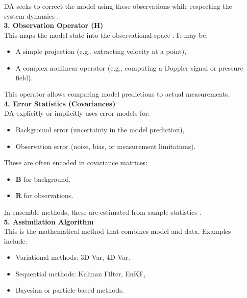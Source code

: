 \documentclass[a4paper]{article}
\begin{document}
DA seeks to correct the model using these observations while respecting the system dynamics \parencite{wikle2007bayesian}.\\

\textbf{3. Observation Operator (H)}\\

This maps the model state into the observational space \parencite{law2015data}. It may be:\\

\begin{itemize}
  \item A simple projection (e.g., extracting velocity at a point),
  \item A complex nonlinear operator (e.g., computing a Doppler signal or pressure field).
\end{itemize}

This operator allows comparing model predictions to actual measurements.\\

\textbf{4. Error Statistics (Covariances)}\\

DA explicitly or implicitly uses error models for:\\

\begin{itemize}
  \item Background error (uncertainty in the model prediction),
  \item Observation error (noise, bias, or measurement limitations).
\end{itemize}

These are often encoded in covariance matrices:\\

\begin{itemize}
  \item $\mathbf{B}$ for background,
  \item $\mathbf{R}$ for observations.
\end{itemize}

In ensemble methods, these are estimated from sample statistics \parencite{evensen1994sequential}.\\

\textbf{5. Assimilation Algorithm}\\

This is the mathematical method that combines model and data. Examples include:\\

\begin{itemize}
  \item Variational methods: 3D-Var, 4D-Var,
  \item Sequential methods: Kalman Filter, EnKF,
  \item Bayesian or particle-based methods.
\end{itemize}
\end{document}
